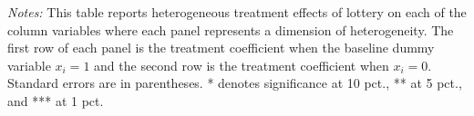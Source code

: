 \begin{table}[h]
{\begin{threeparttable}
\begin{tabular}{l*{4}{c}}
\bottomrule \end{tabular} \begin{tablenotes}[flushleft] \footnotesize \item \emph{Notes:} This table reports heterogeneous treatment effects of lottery on each of the column variables where each panel represents a dimension of heterogeneity. The first row of each panel is the treatment coefficient when the baseline dummy variable \(x_i = 1\) and the second row is the treatment coefficient when \(x_i = 0\). Standard errors are in parentheses. * denotes significance at 10 pct., ** at 5 pct., and *** at 1 pct. \end{tablenotes} \end{threeparttable} } \end{table}
